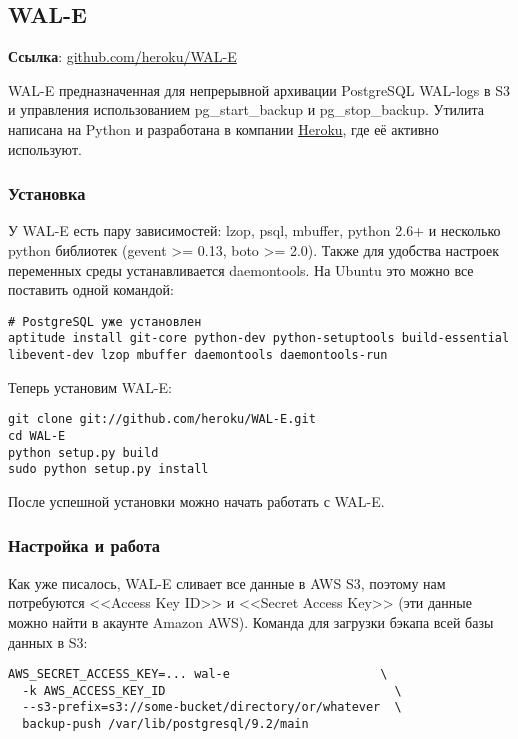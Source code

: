 \subsection{WAL-E}
\textbf{Ссылка}: \href{https://github.com/heroku/WAL-E}{github.com/heroku/WAL-E}

WAL-E предназначенная для непрерывной архивации PostgreSQL WAL-logs в S3 и управления использованием pg\_start\_backup и pg\_stop\_backup. Утилита написана на Python и разработана в компании \href{http://www.heroku.com/}{Heroku}, где её активно используют.

\subsubsection{Установка}

У WAL-E есть пару зависимостей: lzop, psql, mbuffer, python 2.6+ и несколько python библиотек (gevent >= 0.13, boto >= 2.0). Также для удобства настроек переменных среды устанавливается daemontools. На Ubuntu это можно все поставить одной командой:

\begin{lstlisting}[label=lst:wal-e1,caption=Установка зависимостей для WAL-E]
# PostgreSQL уже установлен
aptitude install git-core python-dev python-setuptools build-essential libevent-dev lzop mbuffer daemontools daemontools-run
\end{lstlisting}

Теперь установим WAL-E:

\begin{lstlisting}[label=lst:wal-e2,caption=Установка WAL-E]
git clone git://github.com/heroku/WAL-E.git
cd WAL-E
python setup.py build
sudo python setup.py install
\end{lstlisting}

После успешной установки можно начать работать с WAL-E.

\subsubsection{Настройка и работа}
Как уже писалось, WAL-E сливает все данные в AWS S3, поэтому нам потребуются <<Access Key ID>> и <<Secret Access Key>> (эти данные можно найти в акаунте Amazon AWS). Команда для загрузки бэкапа всей базы данных в S3:

\begin{lstlisting}[label=lst:wal-e3,caption=Загрузка бэкапа всей базы данных в S3]
AWS_SECRET_ACCESS_KEY=... wal-e                     \
  -k AWS_ACCESS_KEY_ID                                \
  --s3-prefix=s3://some-bucket/directory/or/whatever  \
  backup-push /var/lib/postgresql/9.2/main
\end{lstlisting}

